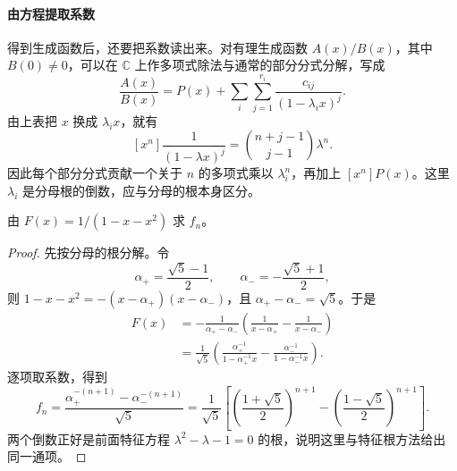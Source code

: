 \documentclass[lang=cn,a4paper,fontset=none,zihao=false,10pt,openany,twoside]{beautybook}
\numberwithin{algorithm}{chapter}
\newcommand{\C}{\mathbb C}
\begin{document}
\paragraph{由方程提取系数}
得到生成函数后，还要把系数读出来。对有理生成函数 $A(x)/B(x)$，其中 $B(0)\ne0$，可以在 $\C$ 上作多项式除法与通常的部分分式分解，写成
\[
 \frac{A(x)}{B(x)}=P(x)+\sum_i\sum_{j=1}^{r_i}\frac{c_{ij}}{(1-\lambda_i x)^j}.
\]
由上表把 $x$ 换成 $\lambda_i x$，就有
\[
 [x^n]\frac1{(1-\lambda x)^j}
 =\binom{n+j-1}{j-1}\lambda^n.
\]
因此每个部分分式贡献一个关于 $n$ 的多项式乘以 $\lambda_i^n$，再加上 $[x^n]P(x)$。这里 $\lambda_i$ 是分母根的倒数，应与分母的根本身区分。

\begin{example}[骨牌递推的通项]
由 $F(x)=1/(1-x-x^2)$ 求 $f_n$。
\end{example}
\begin{proof}
先按分母的根分解。令
\[
 \alpha_+=\frac{\sqrt5-1}{2},\qquad
 \alpha_-=-\frac{\sqrt5+1}{2},
\]
则 $1-x-x^2=-(x-\alpha_+)(x-\alpha_-)$，且 $\alpha_+-\alpha_-=\sqrt5$。于是
\[
 \begin{aligned}
 F(x)
 &=-\frac1{\alpha_+-\alpha_-}
   \left(\frac1{x-\alpha_+}-\frac1{x-\alpha_-}\right)\\
 &=\frac1{\sqrt5}
   \left(\frac{\alpha_+^{-1}}{1-\alpha_+^{-1}x}
        -\frac{\alpha_-^{-1}}{1-\alpha_-^{-1}x}\right).
 \end{aligned}
\]
逐项取系数，得到
\[
 f_n=\frac{\alpha_+^{-(n+1)}-\alpha_-^{-(n+1)}}{\sqrt5}
 =\frac1{\sqrt5}\left[
 \left(\frac{1+\sqrt5}{2}\right)^{n+1}
 -\left(\frac{1-\sqrt5}{2}\right)^{n+1}\right].
\]
两个倒数正好是前面特征方程 $\lambda^2-\lambda-1=0$ 的根，说明这里与特征根方法给出同一通项。
\end{proof}
\end{document}
